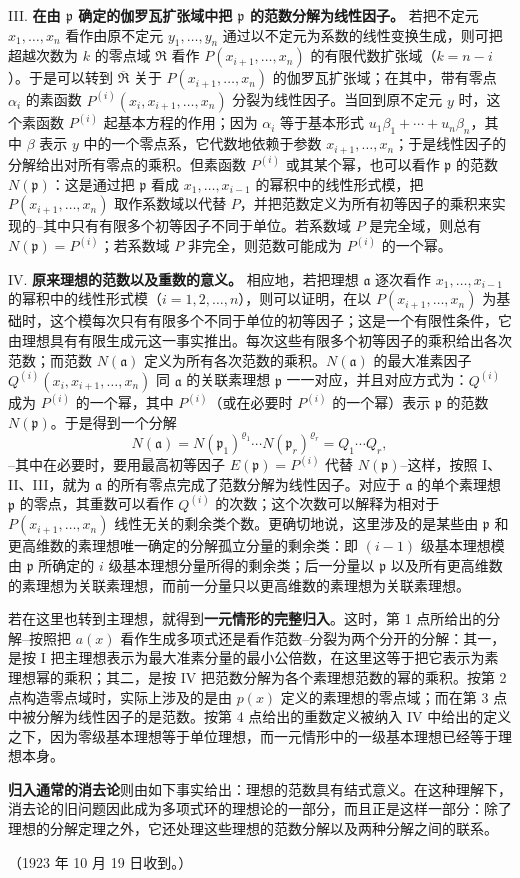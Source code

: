 \documentclass[11pt]{article}
\newcommand{\frakR}{\mathfrak R}
\newcommand{\fraka}{\mathfrak a}
\newcommand{\frakp}{\mathfrak p}
\newcommand{\srcemph}[1]{\textbf{#1}}
\begin{document}
\noindent III. \srcemph{在由 $\frakp$ 确定的伽罗瓦扩张域中把 $\frakp$ 的范数分解为线性因子。} 若把不定元 $x_1,\ldots,x_n$ 看作由原不定元 $y_1,\ldots,y_n$ 通过以不定元为系数的线性变换生成，则可把超越次数为 $k$ 的零点域 $\frakR$ 看作 $P(x_{i+1},\ldots,x_n)$ 的有限代数扩张域（$k=n-i$）。于是可以转到 $\overline{\frakR}$ 关于 $P(x_{i+1},\ldots,x_n)$ 的伽罗瓦扩张域；在其中，带有零点 $\alpha_i$ 的素函数 $P^{(i)}(x_i,x_{i+1},\ldots,x_n)$ 分裂为线性因子。当回到原不定元 $y$ 时，这个素函数 $P^{(i)}$ 起基本方程的作用；因为 $\alpha_i$ 等于基本形式 $u_1\beta_1+\cdots+u_n\beta_n$，其中 $\beta$ 表示 $y$ 中的一个零点系，它代数地依赖于参数 $x_{i+1},\ldots,x_n$；于是线性因子的分解给出对所有零点的乘积。但素函数 $P^{(i)}$ 或其某个幂，也可以看作 $\frakp$ 的范数 $N(\frakp)$：这是通过把 $\frakp$ 看成 $x_1,\ldots,x_{i-1}$ 的幂积中的线性形式模，把 $P(x_{i+1},\ldots,x_n)$ 取作系数域以代替 $P$，并把范数定义为所有初等因子的乘积来实现的--其中只有有限多个初等因子不同于单位。若系数域 $P$ 是完全域，则总有 $N(\frakp)=P^{(i)}$；若系数域 $P$ 非完全，则范数可能成为 $P^{(i)}$ 的一个幂。

\noindent IV. \srcemph{原来理想的范数以及重数的意义。} 相应地，若把理想 $\fraka$ 逐次看作 $x_1,\ldots,x_{i-1}$ 的幂积中的线性形式模（$i=1,2,\ldots,n$），则可以证明，在以 $P(x_{i+1},\ldots,x_n)$ 为基础时，这个模每次只有有限多个不同于单位的初等因子；这是一个有限性条件，它由理想具有有限生成元这一事实推出。每次这些有限多个初等因子的乘积给出各次范数；而范数 $N(\fraka)$ 定义为所有各次范数的乘积。$N(\fraka)$ 的最大准素因子 $Q^{(i)}(x_i,x_{i+1},\ldots,x_n)$ 同 $\fraka$ 的关联素理想 $\frakp$ 一一对应，并且对应方式为：$Q^{(i)}$ 成为 $P^{(i)}$ 的一个幂，其中 $P^{(i)}$（或在必要时 $P^{(i)}$ 的一个幂）表示 $\frakp$ 的范数 $N(\frakp)$。于是得到一个分解
\[
 N(\fraka)=N(\frakp_1)^{\varrho_1}\cdots N(\frakp_r)^{\varrho_r}=Q_1\cdots Q_r,
\]
--其中在必要时，要用最高初等因子 $E(\frakp)=P^{(i)}$ 代替 $N(\frakp)$--这样，按照 I、II、III，就为 $\fraka$ 的所有零点完成了范数分解为线性因子。对应于 $\fraka$ 的单个素理想 $\frakp$ 的零点，其重数可以看作 $Q^{(i)}$ 的次数；这个次数可以解释为相对于 $P(x_{i+1},\ldots,x_n)$ 线性无关的剩余类个数。更确切地说，这里涉及的是某些由 $\frakp$ 和更高维数的素理想唯一确定的分解孤立分量的剩余类：即 $(i-1)$ 级基本理想模由 $\frakp$ 所确定的 $i$ 级基本理想分量所得的剩余类；后一分量以 $\frakp$ 以及所有更高维数的素理想为关联素理想，而前一分量只以更高维数的素理想为关联素理想。

若在这里也转到主理想，就得到\srcemph{一元情形的完整归入}。这时，第 1 点所给出的分解--按照把 $a(x)$ 看作生成多项式还是看作范数--分裂为两个分开的分解：其一，是按 I 把主理想表示为最大准素分量的最小公倍数，在这里这等于把它表示为素理想幂的乘积；其二，是按 IV 把范数分解为各个素理想范数的幂的乘积。按第 2 点构造零点域时，实际上涉及的是由 $p(x)$ 定义的素理想的零点域；而在第 3 点中被分解为线性因子的是范数。按第 4 点给出的重数定义被纳入 IV 中给出的定义之下，因为零级基本理想等于单位理想，而一元情形中的一级基本理想已经等于理想本身。

\srcemph{归入通常的消去论}则由如下事实给出：理想的范数具有结式意义。在这种理解下，消去论的旧问题因此成为多项式环的理想论的一部分，而且正是这样一部分：除了理想的分解定理之外，它还处理这些理想的范数分解以及两种分解之间的联系。

\begin{center}
（1923 年 10 月 19 日收到。）
\end{center}
\end{document}
